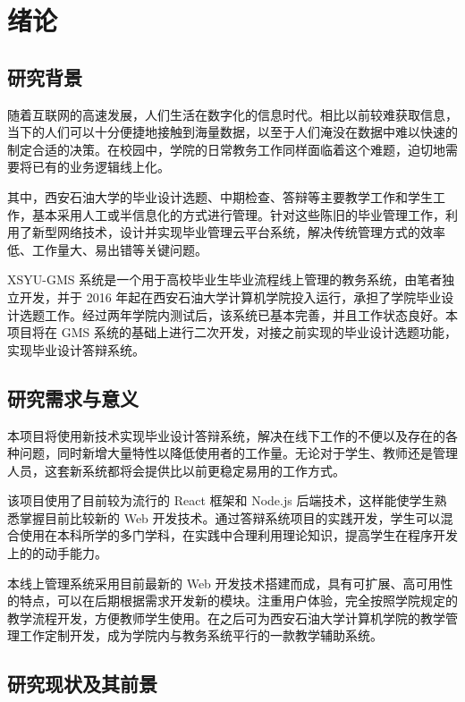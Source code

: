 \section{绪论}

\subsection{研究背景}

随着互联网的高速发展，人们生活在数字化的信息时代。相比以前较难获取信息，当下的人们可以十分便捷地接触到海量数据，以至于人们淹没在数据中难以快速的制定合适的决策。在校园中，学院的日常教务工作同样面临着这个难题，迫切地需要将已有的业务逻辑线上化。

其中，西安石油大学的毕业设计选题、中期检查、答辩等主要教学工作和学生工作，基本采用人工或半信息化的方式进行管理。针对这些陈旧的毕业管理工作，利用了新型网络技术，设计并实现毕业管理云平台系统，解决传统管理方式的效率低、工作量大、易出错等关键问题。

XSYU-GMS 系统是一个用于高校毕业生毕业流程线上管理的教务系统，由笔者独立开发，并于 2016 年起在西安石油大学计算机学院投入运行，承担了学院毕业设计选题工作。经过两年学院内测试后，该系统已基本完善，并且工作状态良好。本项目将在 GMS 系统的基础上进行二次开发，对接之前实现的毕业设计选题功能，实现毕业设计答辩系统。

\subsection{研究需求与意义}

本项目将使用新技术实现毕业设计答辩系统，解决在线下工作的不便以及存在的各种问题，同时新增大量特性以降低使用者的工作量。无论对于学生、教师还是管理人员，这套新系统都将会提供比以前更稳定易用的工作方式。

该项目使用了目前较为流行的 React 框架和 Node.js 后端技术，这样能使学生熟悉掌握目前比较新的 Web 开发技术。通过答辩系统项目的实践开发，学生可以混合使用在本科所学的多门学科，在实践中合理利用理论知识，提高学生在程序开发上的的动手能力。

本线上管理系统采用目前最新的 Web 开发技术搭建而成，具有可扩展、高可用性的特点，可以在后期根据需求开发新的模块。注重用户体验，完全按照学院规定的教学流程开发，方便教师学生使用。在之后可为西安石油大学计算机学院的教学管理工作定制开发，成为学院内与教务系统平行的一款教学辅助系统。

\subsection{研究现状及其前景}

